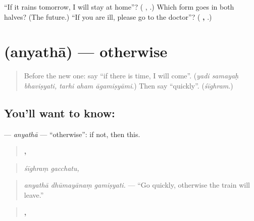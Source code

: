 \begin{tcolorbox}[breakable,colback=teal!4,colframe=teal!35!black,title={Before you move on}]
\textquotedblleft{}If it rains tomorrow, I will stay at home\textquotedblright{}? (\textbf{   }, \textbf{   }.) Which form goes in both halves? (The future.) \textquotedblleft{}If you are ill, please go to the doctor\textquotedblright{}? (\textbf{   ,   }.)
\end{tcolorbox}
\section[\texorpdfstring{\sk{अन्यथा} (anyathā)}{अन्यथा (anyathā)}]{ (anyathā) — otherwise}

\label{lesson:SA-C284-anyatha}



\begin{quote}
Before the new one: say \textquotedblleft{}if there is time, I will come\textquotedblright{}. (\emph{yadi samayaḥ bhaviṣyati, tarhi aham āgamiṣyāmi}.) Then say \textquotedblleft{}quickly\textquotedblright{}. (\emph{śīghram}.)
\end{quote}

\subsection*{You'll want to know: }
\textbf{} — \emph{anyathā} — \textquotedblleft{}otherwise\textquotedblright{}: if not, then this.

\begin{quote}
\textbf{ ,}
\end{quote}

\begin{quote}
\emph{śīghraṃ gacchatu,}
\end{quote}

\begin{quote}
\textbf{  }
\end{quote}

\begin{quote}
\emph{anyathā dhūmayānaṃ gamiṣyati.} — \textquotedblleft{}Go quickly, otherwise the train will leave.\textquotedblright{}
\end{quote}

\begin{quote}
\textbf{  ,}
\end{quote}

